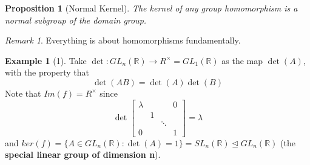\documentclass[12pt]{article}
\newtheorem{prop}[thm]{Proposition}
\theoremstyle{definition}
\newtheorem{eg}[thm]{Example}
\theoremstyle{remark}
\newtheorem{rmk}[thm]{Remark}
\numberwithin{equation}{section}
\newcommand\R{\mathbb R}    %
\newcommand\B[1]{\textbf{ #1}}
\newcommand\nsub{\trianglelefteq}
\begin{document}
\vspace{15pt}

\begin{prop}[Normal Kernel]
        The kernel of any group homomorphism is a normal subgroup of the domain group.
\end{prop}

\vspace{15pt}

\begin{rmk}
        Everything is about homomorphisms fundamentally.
\end{rmk}


\vspace{15pt}


\begin{eg}[1]
        Take $\det: GL_n(\R) \rightarrow R^{\times} = GL_1(\R)$ as the map $\det(A)$, with the property that \begin{equation}
                \det(AB) = \det(A)\det(B)
        \end{equation}
        Note that $Im(f) = R^{\times}$ since \begin{equation*}
                \det\begin{bmatrix} \lambda & & & 0 \\ & 1 & & \\ & & \ddots & \\ 0 & & & 1 \end{bmatrix} = \lambda
        \end{equation*}
        and $ker(f) = \{A \in GL_n(\R): \det(A) = 1\} = SL_n(\R) \nsub GL_n(\R)$ (the \B{special linear group of dimension n}).
\end{eg}

\vspace{15pt}
\end{document}
